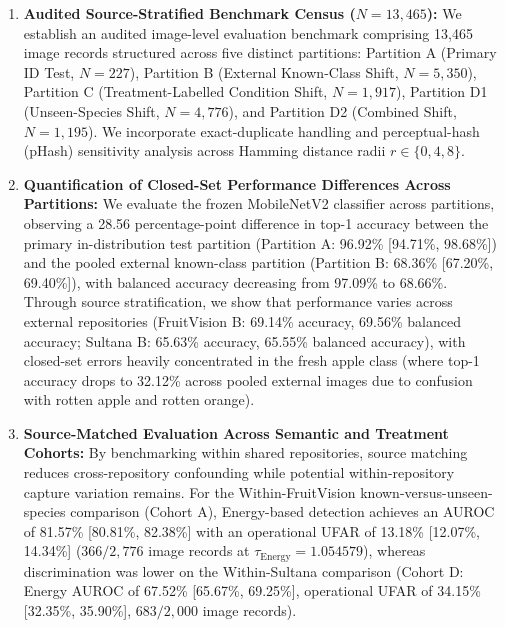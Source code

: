 \begin{enumerate}
\item \textbf{Audited Source-Stratified Benchmark Census ($N = 13,465$):} We establish an audited image-level evaluation benchmark comprising 13,465 image records structured across five distinct partitions: Partition A (Primary ID Test, $N=227$), Partition B (External Known-Class Shift, $N=5,350$), Partition C (Treatment-Labelled Condition Shift, $N=1,917$), Partition D1 (Unseen-Species Shift, $N=4,776$), and Partition D2 (Combined Shift, $N=1,195$). We incorporate exact-duplicate handling and perceptual-hash (pHash) sensitivity analysis across Hamming distance radii $r \in \{0, 4, 8\}$.
\item \textbf{Quantification of Closed-Set Performance Differences Across Partitions:} We evaluate the frozen MobileNetV2 classifier across partitions, observing a 28.56 percentage-point difference in top-1 accuracy between the primary in-distribution test partition (Partition A: 96.92\% [94.71\%, 98.68\%]) and the pooled external known-class partition (Partition B: 68.36\% [67.20\%, 69.40\%]), with balanced accuracy decreasing from 97.09\% to 68.66\%. Through source stratification, we show that performance varies across external repositories (FruitVision B: 69.14\% accuracy, 69.56\% balanced accuracy; Sultana B: 65.63\% accuracy, 65.55\% balanced accuracy), with closed-set errors heavily concentrated in the fresh apple class (where top-1 accuracy drops to 32.12\% across pooled external images due to confusion with rotten apple and rotten orange).
\item \textbf{Source-Matched Evaluation Across Semantic and Treatment Cohorts:} By benchmarking within shared repositories, source matching reduces cross-repository confounding while potential within-repository capture variation remains. For the Within-FruitVision known-versus-unseen-species comparison (Cohort A), Energy-based detection achieves an AUROC of 81.57\% [80.81\%, 82.38\%] with an operational UFAR of 13.18\% [12.07\%, 14.34\%] ($366/2,776$ image records at $\tau_{\text{Energy}}=1.054579$), whereas discrimination was lower on the Within-Sultana comparison (Cohort D: Energy AUROC of 67.52\% [65.67\%, 69.25\%], operational UFAR of 34.15\% [32.35\%, 35.90\%], $683/2,000$ image records).

\end{enumerate}
